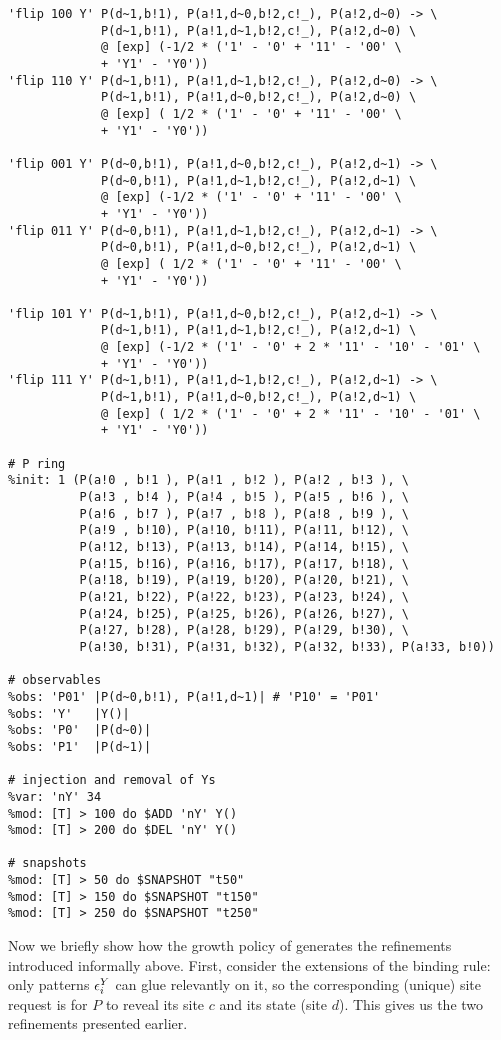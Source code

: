 \begin{lstlisting}[language=kappa]
'flip 100 Y' P(d~1,b!1), P(a!1,d~0,b!2,c!_), P(a!2,d~0) -> \
             P(d~1,b!1), P(a!1,d~1,b!2,c!_), P(a!2,d~0) \
             @ [exp] (-1/2 * ('1' - '0' + '11' - '00' \
             + 'Y1' - 'Y0'))
'flip 110 Y' P(d~1,b!1), P(a!1,d~1,b!2,c!_), P(a!2,d~0) -> \
             P(d~1,b!1), P(a!1,d~0,b!2,c!_), P(a!2,d~0) \
             @ [exp] ( 1/2 * ('1' - '0' + '11' - '00' \
             + 'Y1' - 'Y0'))

'flip 001 Y' P(d~0,b!1), P(a!1,d~0,b!2,c!_), P(a!2,d~1) -> \
             P(d~0,b!1), P(a!1,d~1,b!2,c!_), P(a!2,d~1) \
             @ [exp] (-1/2 * ('1' - '0' + '11' - '00' \
             + 'Y1' - 'Y0'))
'flip 011 Y' P(d~0,b!1), P(a!1,d~1,b!2,c!_), P(a!2,d~1) -> \
             P(d~0,b!1), P(a!1,d~0,b!2,c!_), P(a!2,d~1) \
             @ [exp] ( 1/2 * ('1' - '0' + '11' - '00' \
             + 'Y1' - 'Y0'))

'flip 101 Y' P(d~1,b!1), P(a!1,d~0,b!2,c!_), P(a!2,d~1) -> \
             P(d~1,b!1), P(a!1,d~1,b!2,c!_), P(a!2,d~1) \
             @ [exp] (-1/2 * ('1' - '0' + 2 * '11' - '10' - '01' \
             + 'Y1' - 'Y0'))
'flip 111 Y' P(d~1,b!1), P(a!1,d~1,b!2,c!_), P(a!2,d~1) -> \
             P(d~1,b!1), P(a!1,d~0,b!2,c!_), P(a!2,d~1) \
             @ [exp] ( 1/2 * ('1' - '0' + 2 * '11' - '10' - '01' \
             + 'Y1' - 'Y0'))

# P ring
%init: 1 (P(a!0 , b!1 ), P(a!1 , b!2 ), P(a!2 , b!3 ), \
          P(a!3 , b!4 ), P(a!4 , b!5 ), P(a!5 , b!6 ), \
          P(a!6 , b!7 ), P(a!7 , b!8 ), P(a!8 , b!9 ), \
          P(a!9 , b!10), P(a!10, b!11), P(a!11, b!12), \
          P(a!12, b!13), P(a!13, b!14), P(a!14, b!15), \
          P(a!15, b!16), P(a!16, b!17), P(a!17, b!18), \
          P(a!18, b!19), P(a!19, b!20), P(a!20, b!21), \
          P(a!21, b!22), P(a!22, b!23), P(a!23, b!24), \
          P(a!24, b!25), P(a!25, b!26), P(a!26, b!27), \
          P(a!27, b!28), P(a!28, b!29), P(a!29, b!30), \
          P(a!30, b!31), P(a!31, b!32), P(a!32, b!33), P(a!33, b!0))

# observables
%obs: 'P01' |P(d~0,b!1), P(a!1,d~1)| # 'P10' = 'P01'
%obs: 'Y'   |Y()|
%obs: 'P0'  |P(d~0)|
%obs: 'P1'  |P(d~1)|

# injection and removal of Ys
%var: 'nY' 34
%mod: [T] > 100 do $ADD 'nY' Y()
%mod: [T] > 200 do $DEL 'nY' Y()

# snapshots
%mod: [T] > 50 do $SNAPSHOT "t50"
%mod: [T] > 150 do $SNAPSHOT "t150"
%mod: [T] > 250 do $SNAPSHOT "t250"
\end{lstlisting}

Now we briefly show how the growth policy of 
generates the refinements introduced informally above.
First, consider the extensions of the binding rule: %
only patterns $\epsilon^Y_i$ can glue relevantly on it,
so the corresponding (unique) site request is
for $P$ to reveal its site $c$ and its state (\ie site $d$).
This gives us the two refinements presented earlier.

